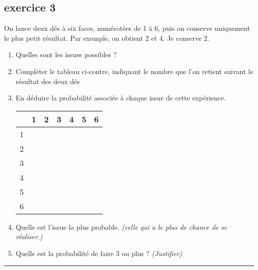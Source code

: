 \documentclass[11pt]{article}
\newcommand{\horrule}[1]{\rule{\linewidth}{#1}} %
\begin{document}
\begin{multicols}{2}
  \subsection*{exercice 3}

  On lance deux dés à six faces, numérotées de 1 à 6, puis on conserve uniquement le plus petit résultat. Par exemple, on obtient 2 et 4. Je conserve 2.

  \begin{enumerate}
  \item Quelles sont les issues possibles ?
  \item Compléter le tableau ci-contre, indiquant le nombre que l’on retient suivant le résultat des deux dés
  \item En déduire la probabilité associée à chaque issue de cette expérience. 
    \begin{center}
      \begin{tabular}{|c|c|c|c|c|c|c|}
        \hline
        & 1 & 2 & 3 & 4 & 5 & 6 \\
        \hline
        1 &   &   &   &   &   &\\  
        \hline
        2 &   &   &   &   &   &\\  
        \hline
        3 &   &   &   &   &   &\\  
        \hline
        4 &   &   &   &   &   &\\  
        \hline
        5 &   &   &   &   &   &\\  
        \hline
        6 &   &   &   &   &   &\\
        \hline     
      \end{tabular}
    \end{center}
  \item Quelle est l'issue la plus probable. \textit{(celle qui a le plus de chance de se réaliser.)}
  \item Quelle est la probabilité de faire 3 ou plus ?  \textit{(Justifier)}
  \end{enumerate}
\end{multicols}

\vspace{-0.4cm}
\horrule{1px}
\vspace{-0.8cm}
\end{document}
